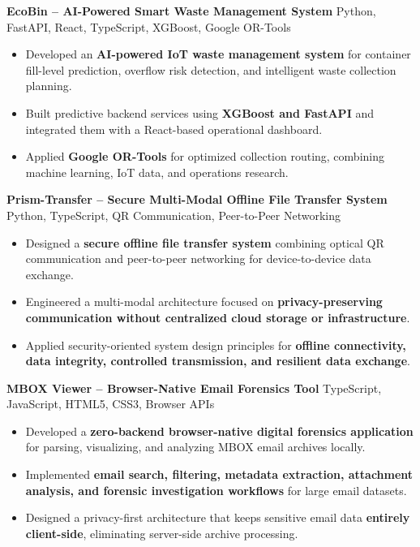 \documentclass[a4paper,11pt]{article}
\newcommand{\resumeItem}[1]{
\item \small{#1 \vspace{-2pt}}
}
\newcommand{\resumeProject}[2]{
\vspace{2pt}
\textbf{#1} \hfill {\small #2}
\vspace{2pt}
}
\begin{document}
\vspace{1mm}

\resumeProject
{EcoBin -- AI-Powered Smart Waste Management System}
{Python, FastAPI, React, TypeScript, XGBoost, Google OR-Tools}

\begin{itemize}[leftmargin=*]

\resumeItem{Developed an \textbf{AI-powered IoT waste management system} for container fill-level prediction, overflow risk detection, and intelligent waste collection planning.}

\resumeItem{Built predictive backend services using \textbf{XGBoost and FastAPI} and integrated them with a React-based operational dashboard.}

\resumeItem{Applied \textbf{Google OR-Tools} for optimized collection routing, combining machine learning, IoT data, and operations research.}

\end{itemize}

\vspace{1mm}

\resumeProject
{Prism-Transfer -- Secure Multi-Modal Offline File Transfer System}
{Python, TypeScript, QR Communication, Peer-to-Peer Networking}

\begin{itemize}[leftmargin=*]

\resumeItem{Designed a \textbf{secure offline file transfer system} combining optical QR communication and peer-to-peer networking for device-to-device data exchange.}

\resumeItem{Engineered a multi-modal architecture focused on \textbf{privacy-preserving communication without centralized cloud storage or infrastructure}.}

\resumeItem{Applied security-oriented system design principles for \textbf{offline connectivity, data integrity, controlled transmission, and resilient data exchange}.}

\end{itemize}

\vspace{1mm}

\resumeProject
{MBOX Viewer -- Browser-Native Email Forensics Tool}
{TypeScript, JavaScript, HTML5, CSS3, Browser APIs}

\begin{itemize}[leftmargin=*]

\resumeItem{Developed a \textbf{zero-backend browser-native digital forensics application} for parsing, visualizing, and analyzing MBOX email archives locally.}

\resumeItem{Implemented \textbf{email search, filtering, metadata extraction, attachment analysis, and forensic investigation workflows} for large email datasets.}

\resumeItem{Designed a privacy-first architecture that keeps sensitive email data \textbf{entirely client-side}, eliminating server-side archive processing.}

\end{itemize}
\end{document}
